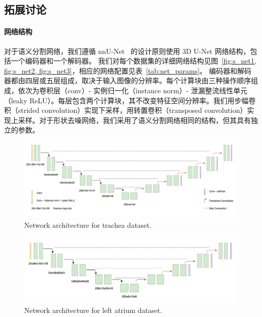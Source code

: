 \subsection{拓展讨论} \label{sec:extension}

\paragraph{网络结构}
对于语义分割网络，我们遵循 nnU-Net~\citep{isensee2019automated} 的设计原则使用 3D U-Net 网络结构，包括一个编码器和一个解码器。
我们对每个数据集的详细网络结构见图~\ref{fig:s_net1, fig:s_net2, fig:s_net3}，相应的网络配置见表~\ref{tab:net_params}。
编码器和解码器都由四层或五层组成，取决于输入图像的分辨率。每个计算块由三种操作顺序组成，依次为卷积层（conv）- 实例归一化（instance norm）- 泄漏整流线性单元（leaky ReLU）。每层包含两个计算块，其不改变特征空间分辨率。我们用步幅卷积（strided convolution）实现下采样，用转置卷积（transposed convolution）实现上采样。对于形状去噪网络，我们采用了语义分割网络相同的结构，但其具有独立的参数。

    \begin{figure}[tbp]
        \centering 
        \includegraphics[width=1.0\textwidth]{img/c3/s_net.png}
        {Network architecture for trachea dataset.}
        \label{fig:s_net1}
    \end{figure}


    \begin{figure}[tbp]
        \centering 
        \includegraphics[width=1.0\textwidth]{img/c3/s_net2.png}
        {Network architecture for left atrium dataset.}
        \label{fig:s_net2}
    \end{figure}


